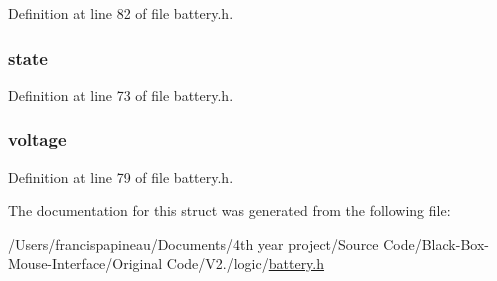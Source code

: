 \-Definition at line 82 of file battery.\-h.

\hypertarget{structbatt_ac6b2518df4ca45cee089e61f152572b2}{
\subsubsection[{state}]{ {\bf state}}}\label{structbatt_ac6b2518df4ca45cee089e61f152572b2}


\-Definition at line 73 of file battery.\-h.

\hypertarget{structbatt_ad769a752524b8ab13170d3e4940686de}{
\subsubsection[{voltage}]{ {\bf voltage}}}\label{structbatt_ad769a752524b8ab13170d3e4940686de}


\-Definition at line 79 of file battery.\-h.



\-The documentation for this struct was generated from the following file\-:\begin{DoxyCompactItemize}
\item 
/\-Users/francispapineau/\-Documents/4th year project/\-Source Code/\-Black-\/\-Box-\/\-Mouse-\/\-Interface/\-Original Code/\-V2./logic/\hyperlink{battery_8h}{battery.\-h}\end{DoxyCompactItemize}

